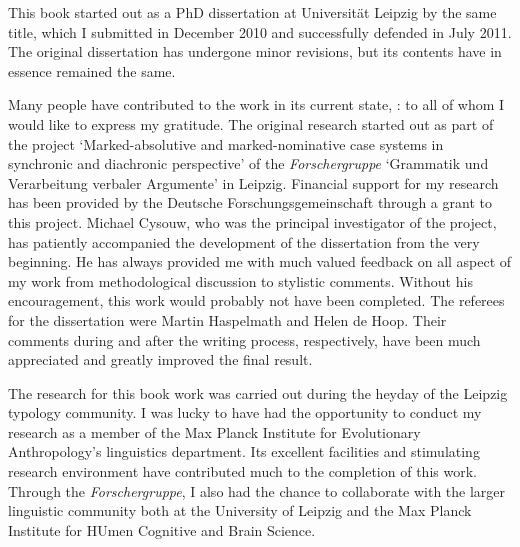 



This book started out as a PhD dissertation at Universit\"at Leipzig by the same title, which I submitted in December 2010 and successfully defended in July 2011. 
The original dissertation has undergone minor revisions, but its contents have in essence remained the same.

Many people have contributed to the work in its current state, : to all of whom I would like to express my gratitude.
The original research started out as part of the  project `Marked-absolutive and marked-nominative case systems in synchronic and diachronic perspective' of the \textit{Forschergruppe} `Grammatik und Verarbeitung verbaler Argumente' in Leipzig. 
Financial support for my research has been provided by the Deutsche Forschungsgemeinschaft through a grant to this project.
Michael Cysouw, who was the principal investigator of the project, has patiently accompanied the development of the dissertation from the very beginning. 
He has always provided me with much valued feedback on all aspect of my work from methodological discussion to stylistic comments.  
Without his encouragement, this work would probably not have been completed.
The referees for the dissertation were Martin Haspelmath and Helen de Hoop.
Their comments during and after the writing process, respectively, have been much appreciated and greatly improved the final result. 
 
The research for this book work was carried out during the heyday of the Leipzig typology community.
I was lucky to have had the opportunity to conduct my research as a member of the Max Planck Institute for Evolutionary Anthropology's linguistics department.
Its excellent facilities and stimulating research environment have contributed much to the completion of this work. 
Through the \textit{Forschergruppe}, I also had the chance to collaborate with the larger linguistic community both at the University of Leipzig and the Max Planck Institute for HUmen Cognitive and Brain Science.

